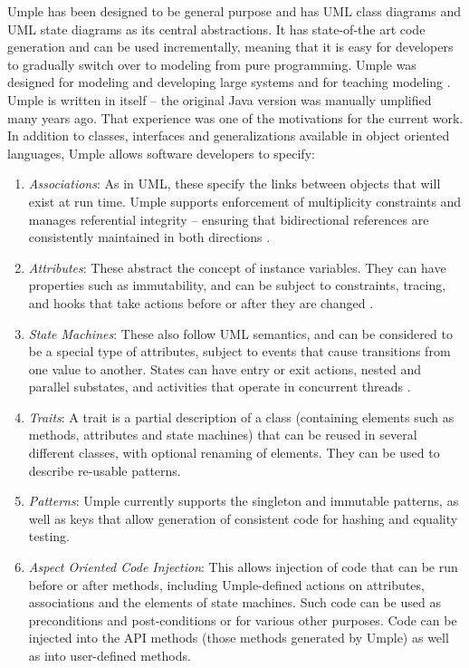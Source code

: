 Umple has been designed to be general purpose and has UML class diagrams and UML state diagrams as its central abstractions. It has state-of-the art code generation and can be used incrementally, meaning that it is easy for developers to gradually switch over to modeling from pure programming. Umple was designed for modeling and developing large systems and for teaching modeling \cite{teachingUmple}. Umple is written in itself -- the original Java version was manually umplified many years ago. That experience was one of the motivations for the current work.
In addition to classes, interfaces and generalizations available in object oriented languages, Umple allows software developers to specify:
\begin{enumerate}
 \item 	\textit{Associations}: As in UML, these specify the links between objects that will exist at run time. Umple supports enforcement of multiplicity constraints and manages referential integrity – ensuring that bidirectional references are consistently maintained in both directions \cite{UmpleAssociations}.
 \item 	\textit{Attributes}: These abstract the concept of instance variables. They can have properties such as immutability, and can be subject to constraints, tracing, and hooks that take actions before or after they are changed \cite{UmpleAttributes}.
 \item \textit{	State Machines}: These also follow UML semantics, and can be considered to be a special type of attributes, subject to events that cause transitions from one value to another. States can have entry or exit actions, nested and parallel substates, and activities that operate in concurrent threads \cite{Badreddin2012_Thesis}.
 \item 	\textit{Traits}: A trait is a partial description of a class (containing elements such as methods, attributes and state machines) that can be reused in several different classes, with optional renaming of elements. They can be used to describe re-usable patterns.
 \item 	\textit{Patterns}: Umple currently supports the singleton and immutable patterns, as well as keys that allow generation of consistent code for hashing and equality testing.
 \item 	\textit{Aspect Oriented Code Injection}: This allows injection of code that can be run before or after methods, including Umple-defined actions on attributes, associations and the elements of state machines. Such code can be used as preconditions and post-conditions or for various other purposes. Code can be injected into the API methods (those methods generated by Umple) as well as into user-defined methods. 

\end{enumerate}
